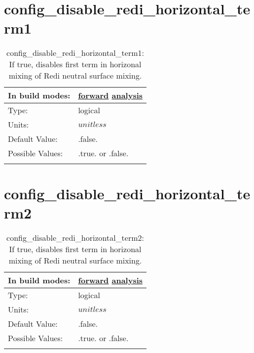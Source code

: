 \section[config\_disable\_redi\_horizontal\_term1]{config\_disable\_redi\_horizontal\_term1}
\label{sec:nm_sec_config_disable_redi_horizontal_term1}
\begin{center}
\begin{longtable}{| p{2.0in} || p{4.0in} |}
    \hline
    In build modes: & \hyperref[subsec:forward_nm_tab_debug]{forward} \hyperref[subsec:analysis_nm_tab_debug]{analysis} \\
    \hline
    Type: & logical \\
    \hline
    Units: & $unitless$ \\
    \hline
    Default Value: & .false. \\
    \hline
    Possible Values: & .true. or .false. \\
    \hline
    \caption{config\_disable\_redi\_horizontal\_term1: If true, disables first term in horizonal mixing of Redi neutral surface mixing.}
\end{longtable}
\end{center}
\section[config\_disable\_redi\_horizontal\_term2]{config\_disable\_redi\_horizontal\_term2}
\label{sec:nm_sec_config_disable_redi_horizontal_term2}
\begin{center}
\begin{longtable}{| p{2.0in} || p{4.0in} |}
    \hline
    In build modes: & \hyperref[subsec:forward_nm_tab_debug]{forward} \hyperref[subsec:analysis_nm_tab_debug]{analysis} \\
    \hline
    Type: & logical \\
    \hline
    Units: & $unitless$ \\
    \hline
    Default Value: & .false. \\
    \hline
    Possible Values: & .true. or .false. \\
    \hline
    \caption{config\_disable\_redi\_horizontal\_term2: If true, disables first term in horizonal mixing of Redi neutral surface mixing.}
\end{longtable}
\end{center}
